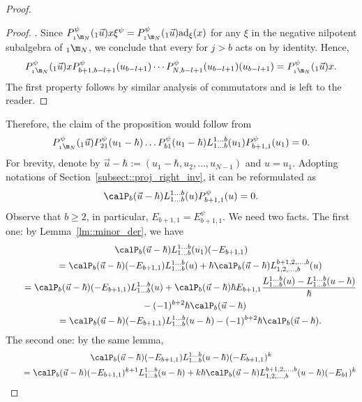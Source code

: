 \begin{Proposition}
\begin{proof}
\begin{Lemma}
\begin{proof}
.
					Since
$
					P_{{}_1\m_{N}}^{\psi}({}_1\vec{u}) x \xi^{\psi} = P_{{}_1\m_{N}}^{\psi}({}_1\vec{u}) \mathrm{ad}_{\xi}(x)
$
					for any $\xi$ in the negative nilpotent subalgebra of ${}_1 \m_N$, we conclude that every  for $j>b$ acts on  by identity. Hence,
					\[
					P_{{}_1\m_{N}}^{\psi}({}_1\vec{u}) x P_{b+1,b-l+1}^{\psi}(u_{b-l+1}) \cdots P_{N,b-l+1}^{\psi}(u_{b-l+1})(u_{b-l+1}) = P_{{}_1\m_{N}}^{\psi}({}_1\vec{u}) x.
					\]
					The first property follows by similar analysis of commutators and is left to the reader.
				\end{proof}
			\end{Lemma}
			Therefore, the claim of the proposition would follow from
			\[
			P_{{}_1\m_N}^{\psi}({}_1\vec{u}) P_{21}^{\psi}(u_1-\hbar) \dots P_{b1}^{\psi}(u_1-\hbar) L_{1\dots b}^{1\dots b}(u_1) P_{b+1,1}^{\psi}(u_1) = 0.
			\]
			For brevity, denote by $\vec{u} - \hbar := (u_1-\hbar,u_2,\dots,u_{N-1})$ and $u=u_1$. Adopting notations of Section~\ref{subsect::proj_right_inv}, it can be reformulated as
			\[
			\calP_{b}(\vec{u}-\hbar) L_{1\dots b}^{1\dots b}(u) P_{b+1,1}^{\psi} (u) = 0.
			\]
			Observe that $b \geq 2$, in particular, $E_{b+1,1} = E_{b+1,1}^{\psi}$. We need two facts. The first one: by Lemma~\ref{lm::minor_der}, we have
			\begin{gather*}
				\calP_{b}(\vec{u}-\hbar) L_{1\dots b}^{1\dots b}(u_1) (-E_{b+1,1}) \\
				\qquad=\calP_{b}(\vec{u}-\hbar) (-E_{b+1,1}) L_{1\dots b}^{1\dots b}(u) + \hbar \calP_{b}(\vec{u}-\hbar) L_{1,2,\dots,b}^{b+1,2,\dots,b}(u) \\
				\qquad=\calP_{b}(\vec{u}-\hbar) (-E_{b+1,1}) L_{1\dots b}^{1\dots b}(u) + \calP_b(\vec{u}-\hbar)\hbar E_{b+1,1} \frac{L_{1\dots b}^{1\dots b}(u) - L_{1\dots b}^{1\dots b}(u-\hbar)}{\hbar} \\
				\phantom{\qquad=}{}- (-1)^{b+2} \hbar \calP_{b}(\vec{u}-\hbar) \\
				\qquad= \calP_{b}(\vec{u}-\hbar) (-E_{b+1,1}) L_{1\dots b}^{1\dots b}(u-\hbar) - (-1)^{b+2} \hbar \calP_{b}(\vec{u}-\hbar).
			\end{gather*}
			The second one: by the same lemma,
			\begin{gather*}
				\calP_{b}(\vec{u}-\hbar) (-E_{b+1,1}) L_{1\dots b}^{1\dots b}(u-\hbar) (-E_{b+1,1})^{k} \\
				\qquad= \calP_{b}(\vec{u}-\hbar) (-E_{b+1,1})^{k+1} L_{1\dots b}^{1\dots b}(u-\hbar) + k\hbar \calP_{b}(\vec{u}-\hbar) L_{1,2,\dots,b}^{b+1,2,\dots,b}(u-\hbar) (-E_{b1})^k

\end{gather*}
\end{proof}
\end{Proposition}
